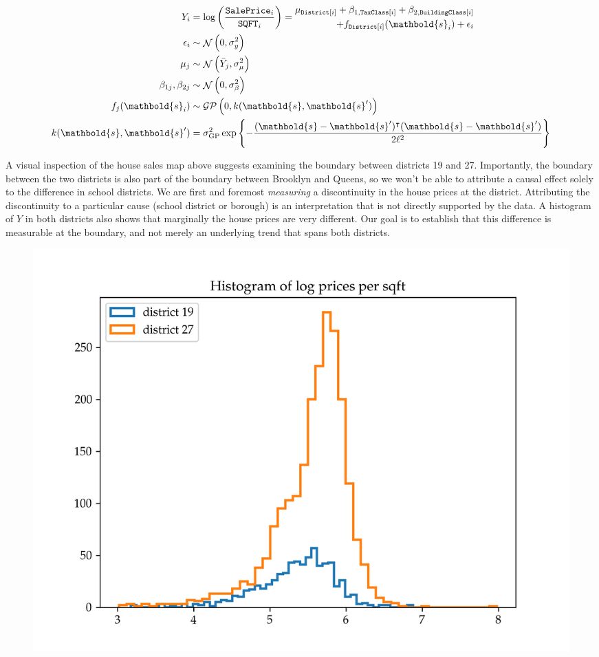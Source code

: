 \documentclass[letter]{article}
\makeatletter
\def\maxwidth{\ifdim\Gin@nat@width>\linewidth\linewidth
\else\Gin@nat@width\fi}
\let\Oldincludegraphics\includegraphics
\renewcommand{\includegraphics}[1]{\Oldincludegraphics[width=1.0\maxwidth]{#1}}
\DeclareMathOperator{\normal}{\mathcal{N}}
\newcommand{\saleprice}{\mathtt{SalePrice}}
\newcommand{\sqft}{\mathtt{SQFT}}
\newcommand{\tax}{\mathtt{TaxClass}}
\newcommand{\building}{\mathtt{BuildingClass}}
\newcommand{\district}{\mathtt{District}}
\newcommand{\gp}{\mathcal{GP}}
\newcommand{\trans}{^{\intercal}}
\newcommand{\sigmaf}{\sigma_{\mathrm{GP}}}
\newcommand{\svec}{\mathbold{s}}
\makeatother
\begin{document}
\begin{equation}
\begin{split}
    Y_i &= \log\del{ \frac{\saleprice_i}{\sqft_i}} =
        \begin{split}
             \mu_{\district\sbr{i}} + \beta_{1,\tax\sbr{i}} + \beta_{2,\building\sbr{i}} \\
                  + f_{\district\sbr{i}}(\svec_i) + \epsilon_i \\
         \end{split}
    \\
    \epsilon_i &\sim \normal\del{0, \sigma_y^2} \\
    \mu_{j} &\sim \normal\del{\bar{Y}_j, \sigma_\mu^2} \\
    \beta_{1j},\beta_{2j} &\sim \normal\del{0, \sigma_\beta^2} \\
    f_j(\svec_i) &\sim \gp\del{0, k(\svec, \svec')} \\
    k(\svec, \svec') &= \sigmaf^2 \exp\cbr{ - \frac{(\svec-\svec')\trans(\svec-\svec')}{2\ell^2}}
\end{split}
\end{equation}

A visual inspection of the house sales map above suggests examining the boundary between districts 19 and 27. Importantly, the boundary between the two districts is also part of the boundary between Brooklyn and Queens, so we won't be able to attribute a causal effect solely to the difference in school districts. We are first and foremost \emph{measuring} a discontinuity in the house prices at the district. Attributing the discontinuity to a particular cause (school district or borough) is an interpretation that is not directly supported by the data.
A histogram of \(Y\) in both districts also shows that marginally the house prices are very different.
Our goal is to establish that this difference is measurable at the boundary, and not merely an underlying trend that spans both districts.

\begin{figure}
\centering
\includegraphics{../NYC/NYC_plots/sales_histogram_19-27.png}
\caption{}
\end{figure}
    
\end{document}
